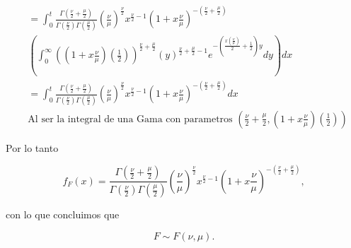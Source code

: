 \documentclass[letterpaper]{article}
\theoremstyle{definition}
\theoremstyle{lemathm}
\theoremstyle{lemathm}
\theoremstyle{lemademthm}
\newcommand{\pars}[1]{\left( #1 \right) }
\newcommand{\1}{\mathbbm{1}}
\begin{document}
\begin{enumerate}
\begin{align*}
			&= \int_{0}^t \frac{\Gamma\pars{\frac{\nu}{2}+\frac{\mu}{2}}}{\Gamma\pars{\frac{\nu}{2}}\Gamma\pars{\frac{\mu}{2}}} \pars{\frac{\nu}{\mu}}^{\frac{\nu}{2}} x^{\frac{\nu}{2}-1} \pars{1 + x\frac{\nu}{\mu}}^{-\pars{\frac{\nu}{2} + \frac{\mu}{2}}}\\ &\pars{\int_{0}^{\infty} \pars{\pars{1 + x\frac{\nu}{\mu}}\pars{\frac{1}{2}}}^{\frac{\nu}{2} + \frac{\mu}{2}} \pars{y}^{\frac{\nu}{2} + \frac{\mu}{2} -1} e^{-\pars{\frac{x\pars{\frac{\nu}{\mu}}}{2} + \frac{1}{2}}y} dy} dx\\
			&= \int_{0}^t \frac{\Gamma\pars{\frac{\nu}{2}+\frac{\mu}{2}}}{\Gamma\pars{\frac{\nu}{2}}\Gamma\pars{\frac{\mu}{2}}} \pars{\frac{\nu}{\mu}}^{\frac{\nu}{2}} x^{\frac{\nu}{2}-1} \pars{1 + x\frac{\nu}{\mu}}^{-\pars{\frac{\nu}{2} + \frac{\mu}{2}}} dx\\
			& \text{Al ser la integral de una Gama con parametros $\pars{\frac{\nu}{2} + \frac{\mu}{2},\pars{1 + x\frac{\nu}{\mu}}\pars{\frac{1}{2}}}$}
		\end{align*}

		Por lo tanto

		\[f_F(x) = \frac{\Gamma\pars{\frac{\nu}{2}+\frac{\mu}{2}}}{\Gamma\pars{\frac{\nu}{2}}\Gamma\pars{\frac{\mu}{2}}} \pars{\frac{\nu}{\mu}}^{\frac{\nu}{2}} x^{\frac{\nu}{2}-1} \pars{1 + x\frac{\nu}{\mu}}^{-\pars{\frac{\nu}{2} + \frac{\mu}{2}}},\]

		con lo que concluimos que

		\[F \sim F(\nu,\mu).\]

    \end{enumerate}

	
\end{document}
